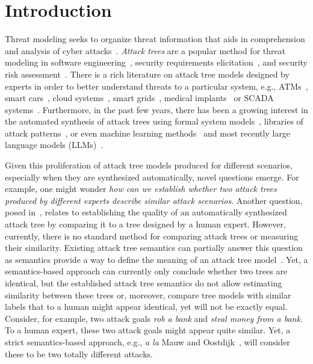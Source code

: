 

\section{Introduction}
\label{sec:introduction}

Threat modeling seeks to organize threat information that aids in comprehension and analysis of cyber attacks~\cite{andersonSecurityEngineeringGuide2020,schneierSecretsLiesDigital2000}. \emph{Attack trees} are a popular method for threat modeling in software engineering~\cite{shostack2014threat,tarandach2020threat}, security requirements elicitation~\cite{rashid2016discovering,mai2018modeling}, and security risk assessment~\cite{ingoldsby2010attack,paul2014unifying}. There is a rich literature on attack tree models designed by experts in order to better understand threats to a particular system, e.g., ATMs~\cite{fraile2016using}, smart cars~\cite{kong2018security,ren2011novel}, cloud systems~\cite{wang2012threat,duncan2019combined}, smart grids~\cite{beckers2014determining,mclaughlin2010energy}, medical implants~\cite{siddiqi2018attack} or SCADA systems~\cite{ten2007vulnerability}. Furthermore, in the past few years, there has been a growing interest in the automated synthesis of attack trees using formal system models~\cite{widel2019beyond,ivanova2015attack,vigo2014automated,pinchinat2015atsyra,gadyatskayaRefinementAwareGenerationAttack2017}, libraries of attack patterns~\cite{jhawar2018semi,bryans2020template}, or even machine learning methods~\cite{sowka2021towards} and most recently large language models (LLMs)~\cite{gadyatskaya2023chatgpt}.

Given this proliferation of attack tree models produced for different scenarios, especially when they are synthesized automatically, novel questions emerge. For example, one might wonder \emph{how can we establish whether two attack trees produced by different experts describe similar attack scenarios}. 
Another question, posed in~\cite{gadyatskaya2023chatgpt}, relates to establishing the quality of an automatically synthesized attack tree by comparing it to a tree designed by a human expert. However, currently, there is no standard method for comparing attack trees or measuring their similarity. Existing attack tree semantics can partially answer this question as semantics provide a way to define the meaning of an attack tree model~\cite{mauwFoundationsAttackTrees2006}. Yet, a semantics-based approach can currently only conclude whether two trees are identical, but the established attack tree semantics do not allow estimating similarity between these trees or, moreover, compare tree models with similar labels that to a human might appear identical, yet will not be exactly equal. Consider, for example, two attack goals \emph{rob a bank} and \emph{steal money from a bank}. To a human expert, these two attack goals might appear quite similar. Yet, a strict semantics-based approach, e.g., \emph{a la} Mauw and Oostdijk~\cite{mauwFoundationsAttackTrees2006}, will consider these to be two totally different attacks.  %

